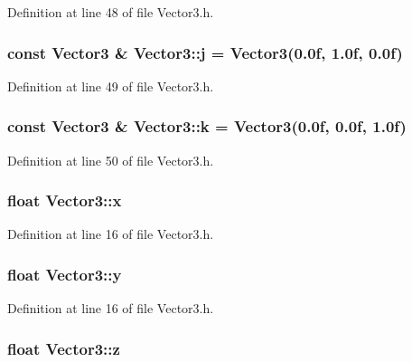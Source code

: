 Definition at line 48 of file Vector3.\+h.

\hypertarget{class_vector3_ab45f6dbb5d5c71c4ef9ffaa6a9cd300f}{
\subsubsection[{j}]{\setlength{\rightskip}{0pt plus 5cm}const {\bf Vector3} \& Vector3\+::j = {\bf Vector3}(0.\+0f, 1.\+0f, 0.\+0f)\hspace{0.3cm}{\ttfamily [static]}}}\label{class_vector3_ab45f6dbb5d5c71c4ef9ffaa6a9cd300f}


Definition at line 49 of file Vector3.\+h.

\hypertarget{class_vector3_a659bddc1d76c28562050e2316184cdda}{
\subsubsection[{k}]{\setlength{\rightskip}{0pt plus 5cm}const {\bf Vector3} \& Vector3\+::k = {\bf Vector3}(0.\+0f, 0.\+0f, 1.\+0f)\hspace{0.3cm}{\ttfamily [static]}}}\label{class_vector3_a659bddc1d76c28562050e2316184cdda}


Definition at line 50 of file Vector3.\+h.

\hypertarget{class_vector3_a7e2d3237b29a2f29d7b3d8b2934e35f2}{
\subsubsection[{x}]{\setlength{\rightskip}{0pt plus 5cm}float Vector3\+::x}}\label{class_vector3_a7e2d3237b29a2f29d7b3d8b2934e35f2}


Definition at line 16 of file Vector3.\+h.

\hypertarget{class_vector3_a86eb35a9fa2d5a49e7fad66a35fa9c13}{
\subsubsection[{y}]{\setlength{\rightskip}{0pt plus 5cm}float Vector3\+::y}}\label{class_vector3_a86eb35a9fa2d5a49e7fad66a35fa9c13}


Definition at line 16 of file Vector3.\+h.

\hypertarget{class_vector3_aa8c9461eb24bd2c364258078811a3e9d}{
\subsubsection[{z}]{\setlength{\rightskip}{0pt plus 5cm}float Vector3\+::z}}\label{class_vector3_aa8c9461eb24bd2c364258078811a3e9d}


